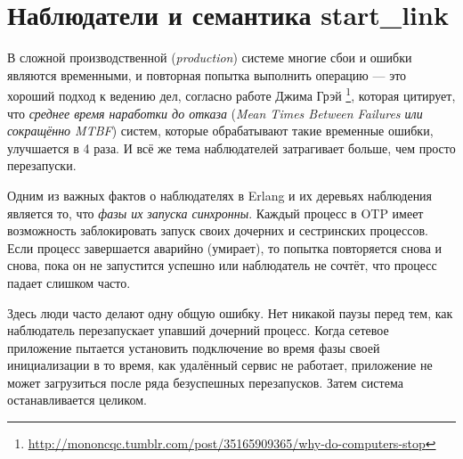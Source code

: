 \documentclass[11pt, oneside]{book}   	%
\begin{document}
\section{Наблюдатели и семантика start\_link}
\label{sec:supervisors-and-start-link-semantics}

В сложной производственной (\emph{production}) системе многие сбои и ошибки являются временными, и повторная попытка выполнить операцию --- это хороший подход к ведению дел, согласно работе Джима Грэй \footnote{\href{http://mononcqc.tumblr.com/post/35165909365/why-do-computers-stop}{http://mononcqc.tumblr.com/post/35165909365/why-do-computers-stop}}, которая цитирует, что \emph{среднее время наработки до отказа} (\emph{Mean Times Between Failures или сокращённо MTBF}) систем, которые обрабатывают такие временные ошибки, улучшается в 4 раза. И всё же тема наблюдателей затрагивает больше, чем просто перезапуски.

Одним из важных фактов о наблюдателях в Erlang и их деревьях наблюдения является то, что \emph{фазы их запуска синхронны}. Каждый процесс в OTP имеет возможность заблокировать запуск своих дочерних и сестринских процессов. Если процесс завершается аварийно (умирает), то попытка повторяется снова и снова, пока он не запустится успешно или наблюдатель не сочтёт, что процесс падает слишком часто.

Здесь люди часто делают одну общую ошибку. Нет никакой паузы перед тем, как наблюдатель перезапускает упавший дочерний процесс. Когда сетевое приложение пытается установить подключение во время фазы своей инициализации в то время, как удалённый сервис не работает, приложение не может загрузиться после ряда безуспешных перезапусков. Затем система останавливается целиком.
\end{document}
